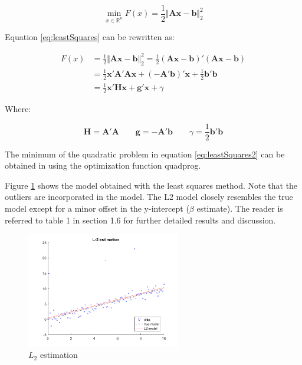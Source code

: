 \begin{equation}
\min\limits_{x \in \mathbb{R}^n} F(x) = \frac{1}{2} \Vert{\mathbf{A x - b}}\Vert^2_2
\label{eq:leastSquares}
\end{equation}

\vspace*{\fill} 
\newpage
Equation \ref{eq:leastSquares} can be rewritten as:

\begin{equation}
\begin{split}
F(x) &= \frac{1}{2} \Vert\mathbf{{A x - b}}\Vert^2_2 = \frac{1}{2} \mathbf{(A x - b)}'\mathbf{(A x - b)} \\
&=  \frac{1}{2} \mathbf{x' A' A x} + \mathbf{(-A' b)'x} + \frac{1}{2} \mathbf{b' b} \\
&= \frac{1}{2} \mathbf{x' H x} + \mathbf{g' x} + \gamma
\end{split}
\label{eq:leastSquares2}
\end{equation}

Where:

\[
\mathbf{H} = \mathbf{A' A} \qquad \mathbf{g} = \mathbf{-A' b} \qquad \gamma = \frac{1}{2} \mathbf{b' b}
\]

The minimum of the quadratic problem in equation \ref{eq:leastSquares2} can be obtained in \matlab using the optimization function quadprog.

Figure \ref{fig:leastSquares} shows the model obtained with the least squares method. Note that the outliers are incorporated in the model. The L2 model closely resembles the true model except for a minor offset in the y-intercept ($\beta$ estimate). The reader is referred to table 1 in section 1.6 for further detailed results and discussion.  

\begin{figure}[htb]
\centering
\includegraphics[width=0.6\textwidth]{../img/L2_norm}
\caption{$L_2$ estimation}
\label{fig:leastSquares}
\end{figure}	

